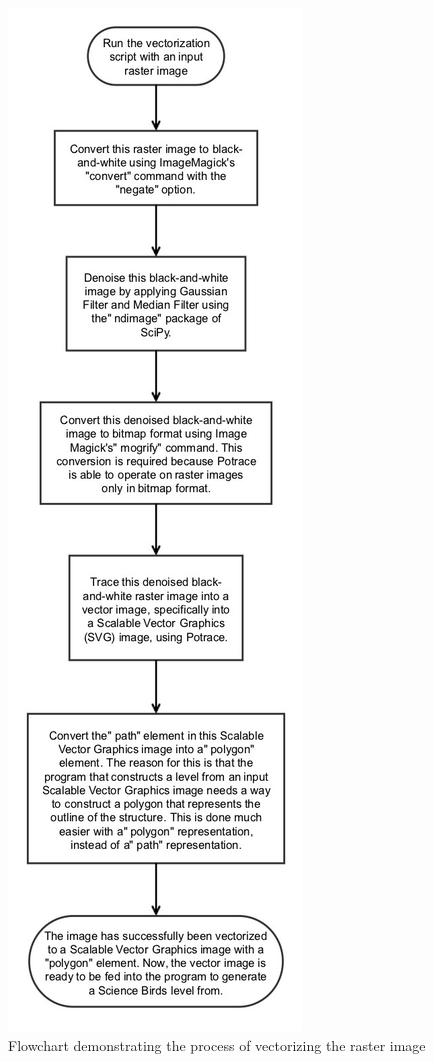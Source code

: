 \documentclass{dalthesis}
\begin{document}
\begin{figure}
	\centering
	\caption{Flowchart demonstrating the process of vectorizing the raster image}
	\label{fig:flowchart}
  \includegraphics[width=\textwidth,height=\textheight,keepaspectratio]{process/science_birds_pcg-raster_to_vector-edited.png}
\end{figure}
\end{document}
